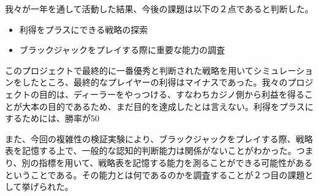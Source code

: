 我々が一年を通して活動した結果、今後の課題は以下の２点であると判断した。

\begin{itemize}
\item 利得をプラスにできる戦略の探索
\item ブラックジャックをプレイする際に重要な能力の調査
\end{itemize}

このプロジェクトで最終的に一番優秀と判断された戦略を用いてシミュレーションをしたところ、最終的なプレイヤーの利得はマイナスであった。我々のプロジェクトの目的は、ディーラーをやっつける、すなわちカジノ側から利益を得ることが大本の目的であるため、まだ目的を達成したとは言えない。利得をプラスにするためには、勝率が50%

また、今回の複雑性の検証実験により、ブラックジャックをプレイする際、戦略表を記憶する上で、一般的な認知的判断能力は関係がないことがわかった。つまり、別の指標を用いて、戦略表を記憶する能力を測ることができる可能性があるということである。その能力とは何であるのかを調査することが２つ目の課題として挙げられた。


